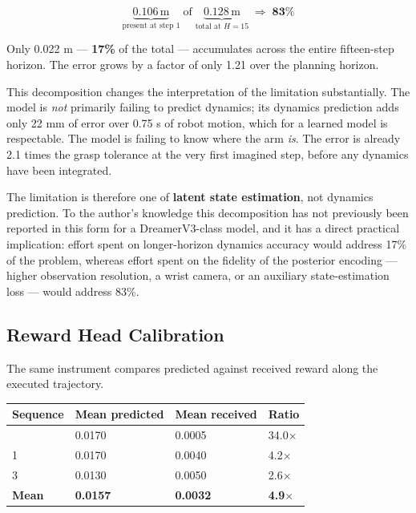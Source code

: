 \documentclass[12pt,a4paper,oneside]{report}
\begin{document}
\begin{equation*}
\underbrace{0.106\,\mathrm{m}}_{\text{present at step 1}} \;\text{of}\; \underbrace{0.128\,\mathrm{m}}_{\text{total at } H=15} \;\Longrightarrow\; \mathbf{83\%}
\end{equation*}

Only 0.022 m --- \textbf{17\%} of the total --- accumulates across the entire fifteen-step
horizon. The error grows by a factor of only 1.21 over the planning horizon.

This decomposition changes the interpretation of the limitation substantially.
The model is \emph{not} primarily failing to predict dynamics; its dynamics prediction
adds only 22 mm of error over 0.75 s of robot motion, which for a learned model
is respectable. The model is failing to know where the arm \emph{is}. The error is
already 2.1 times the grasp tolerance at the very first imagined step, before any
dynamics have been integrated.

The limitation is therefore one of \textbf{latent state estimation}, not dynamics
prediction. To the author's knowledge this decomposition has not previously been
reported in this form for a DreamerV3-class model, and it has a direct practical
implication: effort spent on longer-horizon dynamics accuracy would address 17\%
of the problem, whereas effort spent on the fidelity of the posterior encoding ---
higher observation resolution, a wrist camera, or an auxiliary state-estimation
loss --- would address 83\%.

\hypertarget{reward-head-calibration}{%
\subsection{Reward Head Calibration}\label{reward-head-calibration}}

The same instrument compares predicted against received reward along the executed
trajectory.

\begin{longtable}[]{@{}llll@{}}
\toprule\noalign{}
Sequence & Mean predicted & Mean received & Ratio \\
\midrule\noalign{}
\endhead
\bottomrule\noalign{}
\endlastfoot
0 & 0.0170 & 0.0005 & 34.0$\times$ \\
1 & 0.0170 & 0.0040 & 4.2$\times$ \\
3 & 0.0130 & 0.0050 & 2.6$\times$ \\
\textbf{Mean} & \textbf{0.0157} & \textbf{0.0032} & \textbf{4.9$\times$} \\
\end{longtable}
\end{document}
